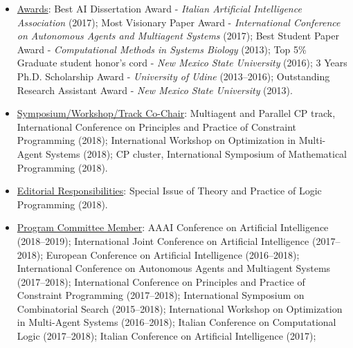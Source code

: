 \documentclass[times, 10pt]{article}
\begin{document}
\begin{itemize}
\item \underline{Awards}:
	Best AI Dissertation Award - \emph{Italian Artificial Intelligence Association} (2017); 
	Most Visionary Paper Award - \emph{International Conference on Autonomous Agents and Multiagent Systems} (2017);
	Best Student Paper Award - \emph{Computational Methods in Systems Biology} (2013);
	Top 5\% Graduate student honor’s cord - \emph{New Mexico State University} (2016);
	3 Years Ph.D. Scholarship Award - \emph{University of Udine} (2013--2016);
	Outstanding Research Assistant Award - \emph{New Mexico State University} (2013).

\item \underline{Symposium/Workshop/Track Co-Chair}:
	Multiagent and Parallel CP track, International Conference on Principles and Practice of Constraint Programming (2018); 
	International Workshop on Optimization in Multi-Agent Systems (2018);
	CP cluster, International Symposium of Mathematical Programming (2018).

\item \underline{Editorial Responsibilities}:
	Special Issue of Theory and Practice of Logic Programming 
(2018).

\item \underline{Program Committee Member}:
	AAAI Conference on Artificial Intelligence  (2018--2019);
	International Joint Conference on Artificial Intelligence (2017--2018);
	European Conference on Artificial Intelligence (2016--2018);
	International Conference on Autonomous Agents and Multiagent Systems  (2017--2018);
	International Conference on Principles and Practice of Constraint Programming (2017--2018);
	International Symposium on Combinatorial Search (2015--2018);
	International Workshop on Optimization in Multi-Agent Systems (2016--2018);
	Italian Conference on Computational Logic (2017--2018);
	Italian Conference on Artificial Intelligence (2017);
\end{itemize}

\end{document}
